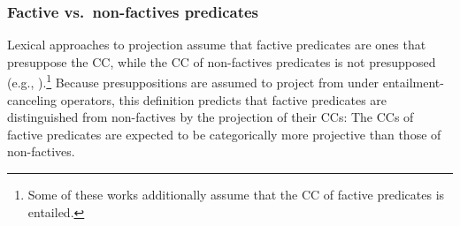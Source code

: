 \documentclass[a4paper,12pt,twoside]{article}
\newcommand{\posscite}[1]{\citeauthor{#1}'s (\citeyear{#1})}
\begin{document}

	\subsubsection{Factive vs.\ non-factives predicates}\label{s:factivity}

        Lexical approaches to projection assume that factive predicates are ones that presuppose the CC, while the CC of non-factives predicates is not presupposed (e.g., \citealt{kiparsky_fact_1970,karttunen_observations_1971,schlenker_local_2010,abrusan_predicting_2011}).\footnote{Some of these works additionally assume that the CC of factive predicates is entailed.} Because presuppositions are assumed to project from under entailment-canceling operators, this definition predicts that factive predicates are distinguished from non-factives by the projection of their CCs: The CCs of factive predicates are expected to be categorically more projective than those of non-factives.

        
\end{document}
